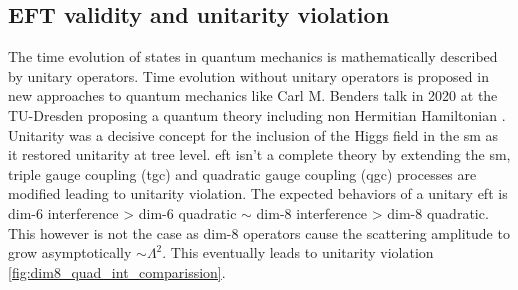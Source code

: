\documentclass[../Bachelorarbeit.tex]{subfiles}
\begin{document}
\subsection{EFT validity and unitarity violation}
The time evolution of states in quantum mechanics is mathematically described by unitary operators. Time evolution without unitary operators is proposed in new approaches to quantum mechanics like Carl M. Benders talk in 2020 at the TU-Dresden
proposing a quantum theory including non Hermitian Hamiltonian \cite{Prof.Dr.CarlBender.2020}. Unitarity was a decisive concept for the inclusion of the Higgs field in the \acrshort{sm} as it restored unitarity at tree level.
\acrshort{eft} isn't a complete theory by extending the \acrshort{sm}, triple gauge coupling (\acrshort{tgc}) and quadratic gauge coupling (\acrshort{qgc}) processes are modified leading to unitarity violation. The expected behaviors of a unitary \acrshort{eft} is dim-6 interference > dim-6 quadratic $\sim$ dim-8 interference > dim-8 quadratic.
This however is not the case as dim-8 operators cause the scattering amplitude to grow asymptotically $\sim \Lambda^{2}$. This eventually leads to unitarity violation \ref{fig:dim8_quad_int_comparission}.
\end{document}
